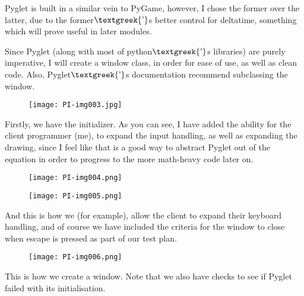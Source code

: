 \documentclass{article}
\begin{document}
\bigskip

Pyglet is built in a similar vein to PyGame, however, I chose the former over the latter, due to the
former$\text{\textgreek{’}}$s better control for deltatime, something which will prove useful in later modules.


\bigskip

Since Pyglet (along with most of python$\text{\textgreek{’}}$s libraries) are purely imperative, I will create a window
class, in order for ease of use, as well as clean code. Also, Pyglet$\text{\textgreek{’}}$s documentation recommend
subclassing the window.

\begin{figure}
\texttt{[image: PI-img003.jpg]}\end{figure}

\bigskip


\bigskip


\bigskip


\bigskip


\bigskip


\bigskip


\bigskip


\bigskip


\bigskip


\bigskip

Firstly, we have the initializer. As you can see, I have added the ability for the client programmer (me), to expand the
input handling, as well as expanding the drawing, since I feel like that is a good way to abstract Pyglet out of the
equation in order to progress to the more math-heavy code later on.



\begin{figure}
\texttt{[image: PI-img004.png]}\end{figure}

\bigskip



\begin{figure}
\texttt{[image: PI-img005.png]}\end{figure}
And this is how we (for example), allow the client to expand their keyboard handling, and of course we have included the
criteria for the window to close when escape is pressed as part of our test plan.



\begin{figure}
\texttt{[image: PI-img006.png]}\end{figure}
This is how we create a window. Note that we also have checks to see if Pyglet failed with its initialisation.
\end{document}
